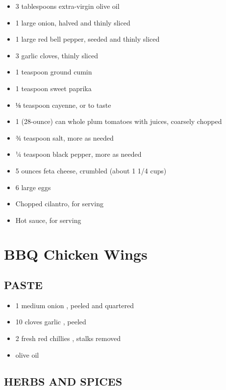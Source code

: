 \documentclass[]{article}
\providecommand{\tightlist}{%
  \setlength{\itemsep}{0pt}\setlength{\parskip}{0pt}}
\begin{document}
\begin{itemize}
\tightlist
\item
  3 tablespoons extra-virgin olive oil
\item
  1 large onion, halved and thinly sliced
\item
  1 large red bell pepper, seeded and thinly sliced
\item
  3 garlic cloves, thinly sliced
\item
  1 teaspoon ground cumin
\item
  1 teaspoon sweet paprika
\item
  ⅛ teaspoon cayenne, or to taste
\item
  1 (28-ounce) can whole plum tomatoes with juices, coarsely chopped
\item
  ¾ teaspoon salt, more as needed
\item
  ¼ teaspoon black pepper, more as needed
\item
  5 ounces feta cheese, crumbled (about 1 1/4 cups)
\item
  6 large eggs
\item
  Chopped cilantro, for serving
\item
  Hot sauce, for serving
\end{itemize}

\hypertarget{bbq-chicken-wings}{%
\section{BBQ Chicken Wings}\label{bbq-chicken-wings}}

\hypertarget{paste}{%
\subsection{PASTE}\label{paste}}

\begin{itemize}
\tightlist
\item
  1 medium onion , peeled and quartered
\item
  10 cloves garlic , peeled
\item
  2 fresh red chillies , stalks removed
\item
  olive oil
\end{itemize}

\hypertarget{herbs-and-spices}{%
\subsection{HERBS AND SPICES}\label{herbs-and-spices}}
\end{document}
